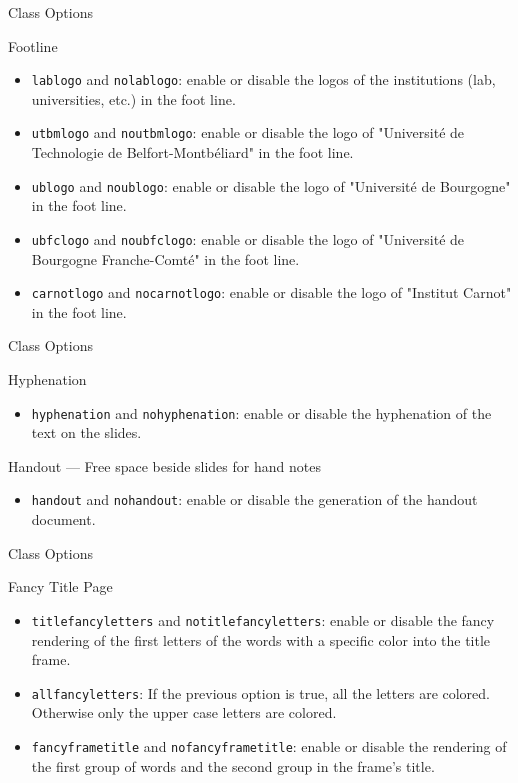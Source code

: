 \documentclass[english,sectioncirclenumberstyle]{ciadbeamer}
\begin{document}
\begin{frame}[t]{Class Options \insertcontinuationtext}
	\begin{block}{Footline}
		\begin{itemize}
		\item \texttt{lablogo} and \texttt{nolablogo}: enable or disable the logos of the institutions (lab, universities, etc.) in the foot line.
		\item \texttt{utbmlogo} and \texttt{noutbmlogo}: enable or disable the logo of "Universit\'e de Technologie de Belfort-Montb\'eliard" in the foot line.
		\item \texttt{ublogo} and \texttt{noublogo}: enable or disable the logo of "Universit\'e de Bourgogne" in the foot line.
		\item \texttt{ubfclogo} and \texttt{noubfclogo}: enable or disable the logo of "Universit\'e de Bourgogne Franche-Comt\'e" in the foot line.
		\item \texttt{carnotlogo} and \texttt{nocarnotlogo}: enable or disable the logo of "Institut Carnot" in the foot line.
		\end{itemize}
	\end{block}
\end{frame}

\begin{frame}[t]{Class Options \insertcontinuationtext}
	\begin{block}{Hyphenation}
		\begin{itemize}
		\item \texttt{hyphenation} and \texttt{nohyphenation}: enable or disable the hyphenation of the text on the slides.
		\end{itemize}
	\end{block}
	\begin{block}{Handout --- Free space beside slides for hand notes}
		\begin{itemize}
		\item \texttt{handout} and \texttt{nohandout}: enable or disable the generation of the handout document.
		\end{itemize}
	\end{block}
\end{frame}

\begin{frame}[t]{Class Options \insertcontinuationtext}
	\begin{block}{Fancy Title Page}
		\begin{itemize}
		\item \texttt{titlefancyletters} and \texttt{notitlefancyletters}: enable or disable the fancy rendering of the first letters of the words with a specific color into the title frame.
		\item \texttt{allfancyletters}: If the previous option is true, all the letters are colored. Otherwise only the upper case letters are colored.
		\item \texttt{fancyframetitle} and \texttt{nofancyframetitle}: enable or disable the rendering of the first group of words and the second group in the frame's title.
		\end{itemize}
	\end{block}
\end{frame}
\end{document}
